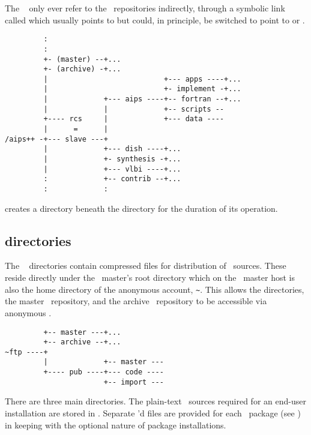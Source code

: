 The \aipspp\  only ever refer to the \rcs\ repositories
indirectly, through a symbolic link called  which usually points to
 but could, in principle, be switched to point to  or
.

\begin{verbatim}
         :
         :
         +- (master) --+...
         +- (archive) -+...
         |                           +--- apps ----+...
         |                           +- implement -+...
         |             +--- aips ----+-- fortran --+...
         |             |             +-- scripts --
         +---- rcs     |             +--- data ----
         |      =      |
/aips++ -+--- slave ---+
         |             +--- dish ----+...
         |             +- synthesis -+...
         |             +--- vlbi ----+...
         :             +-- contrib --+...
         :             :
\end{verbatim}

\noindent
{} creates a  directory beneath the 
directory for the duration of its operation.


\subsection{ directories}
\label{ftp directories}

The \aipspp\  directories contain compressed  files
for distribution of \aipspp\ sources.  These reside directly under the
\aipspp\ master's root directory which on the \aipspp\ master host
 is also the home directory of the anonymous
 account, \verb+~+.  This allows the 
directories, the master \rcs\ repository, and the archive \rcs\ repository to
be accessible via anonymous .

\begin{verbatim}
         +-- master ---+...
         +-- archive --+...
~ftp ----+
         |             +-- master ---
         +---- pub ----+--- code ----
                       +-- import ---
\end{verbatim}

There are three main  directories.  The plain-text \aipspp\ 
sources required for an end-user installation are stored in .
Separate \unixexe{gzip}'d \unixexe{tar} files are provided for each \aipspp\ 
package (see ) in keeping with the optional nature of
package installations.

